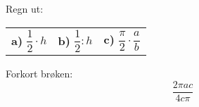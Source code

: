 



Regn ut:\os
\begin{tabular}{@{}l l l}
	\textbf{a)}	$ \dfrac{1}{2}\cdot h $
	& \textbf{b)} $ \dfrac{1}{2}: h  $ 
	& \textbf{c)} $ \dfrac{\pi}{2}\cdot\dfrac{a}{b} $
\end{tabular}

Forkort brøken:
\[ \frac{2\pi a c}{4c\pi} \]




